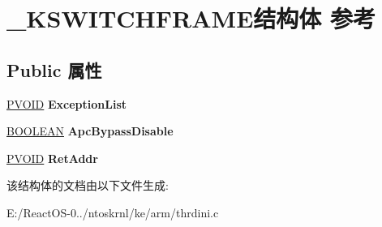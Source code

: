 \hypertarget{struct___k_s_w_i_t_c_h_f_r_a_m_e}{}\section{\+\_\+\+K\+S\+W\+I\+T\+C\+H\+F\+R\+A\+M\+E结构体 参考}
\label{struct___k_s_w_i_t_c_h_f_r_a_m_e}
\subsection*{Public 属性}
\begin{DoxyCompactItemize}
\item 
\mbox{\label{struct___k_s_w_i_t_c_h_f_r_a_m_e_a294cbd48faeb4f332209f8df12b5f050}} 
\hyperlink{interfacevoid}{P\+V\+O\+ID} {\bfseries Exception\+List}
\item 
\mbox{\label{struct___k_s_w_i_t_c_h_f_r_a_m_e_a8602ef4a207ae23f975b177618d42d87}} 
\hyperlink{_processor_bind_8h_a112e3146cb38b6ee95e64d85842e380a}{B\+O\+O\+L\+E\+AN} {\bfseries Apc\+Bypass\+Disable}
\item 
\mbox{\label{struct___k_s_w_i_t_c_h_f_r_a_m_e_a99d608c7ab44506cad4a0ae35f983bec}} 
\hyperlink{interfacevoid}{P\+V\+O\+ID} {\bfseries Ret\+Addr}
\end{DoxyCompactItemize}


该结构体的文档由以下文件生成\+:\begin{DoxyCompactItemize}
\item 
E\+:/\+React\+O\+S-\/0../ntoskrnl/ke/arm/thrdini.\+c\end{DoxyCompactItemize}
